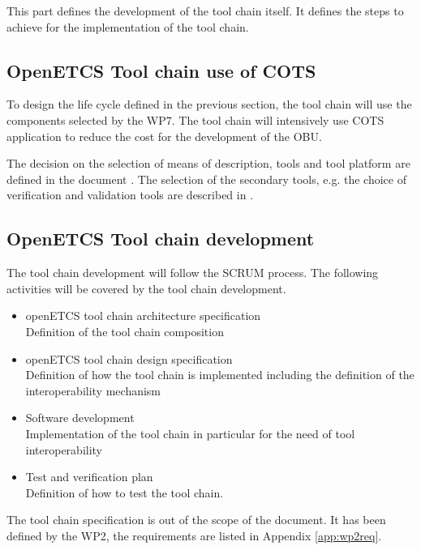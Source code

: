 This part defines the development of the tool chain itself. It defines
the steps to achieve for the implementation of the tool chain.

\subsection{OpenETCS Tool chain use of \gls{COTS}}
To design the life cycle defined in the previous section, the tool chain will
use the components selected by the WP7.  The tool chain will intensively use 
\gls{COTS} application to reduce   the cost for the development of the
\gls{OBU}.

The decision on the selection of means of description, tools and tool platform
are defined in the document \cite{D7.1}. The selection of the secondary tools,
e.g. the choice of verification and validation tools are described in \cite{}.

\subsection{OpenETCS Tool chain development}
The tool chain development will follow the SCRUM process.
The following activities will be covered  by the tool chain development.
\begin{itemize}
\item openETCS tool chain architecture specification\\
Definition of the tool chain composition 
\item openETCS tool chain design specification \\
Definition of how the tool chain is implemented including the
definition of the interoperability mechanism
\item Software development\\
Implementation of the tool chain in particular for the need of tool interoperability
\item Test and verification plan\\
Definition of how to test the tool chain.
\end{itemize}

The tool chain specification is out of the scope of the document. It
has been defined by the WP2, the requirements are listed in Appendix \ref{app:wp2req}.

